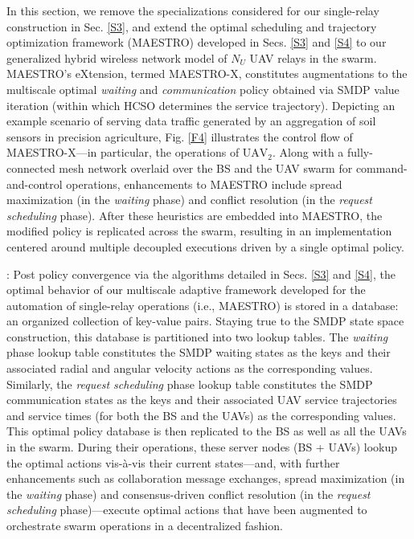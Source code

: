 \documentclass[12pt, draftcls, onecolumn]{IEEEtran}
\theoremstyle{plain}
\theoremstyle{definition}
\theoremstyle{remark}
\begin{document}
In this section, we remove the specializations considered for our single-relay construction in Sec. \ref{S3}, and extend the optimal scheduling and trajectory optimization framework (MAESTRO) developed in Secs. \ref{S3} and \ref{S4} to our generalized hybrid wireless network model of $N_{U}$ UAV relays in the swarm. MAESTRO's eXtension, termed MAESTRO-X, constitutes augmentations to the multiscale optimal \emph{waiting} and \emph{communication} policy obtained via SMDP value iteration (within which HCSO determines the service trajectory). Depicting an example scenario of serving data traffic generated by an aggregation of soil sensors in precision agriculture, Fig. \ref{F4} illustrates the control flow of MAESTRO-X---in particular, the operations of $\mathrm{UAV}_{2}$. Along with a fully-connected mesh network overlaid over the BS and the UAV swarm for command-and-control operations, enhancements to MAESTRO include spread maximization (in the \emph{waiting} phase) and conflict resolution (in the \emph{request scheduling} phase). After these heuristics are embedded into MAESTRO, the modified policy is replicated across the swarm, resulting in an implementation centered around multiple decoupled executions driven by a single optimal policy.

: Post policy convergence via the algorithms detailed in Secs. \ref{S3} and \ref{S4}, the optimal behavior of our multiscale adaptive framework developed for the automation of single-relay operations (i.e., MAESTRO) is stored in a database: an organized collection of key-value pairs. Staying true to the SMDP state space construction, this database is partitioned into two lookup tables. The \emph{waiting} phase lookup table constitutes the SMDP waiting states as the keys and their associated radial and angular velocity actions as the corresponding values. Similarly, the \emph{request scheduling} phase lookup table constitutes the SMDP communication states as the keys and their associated UAV service trajectories and service times (for both the BS and the UAVs) as the corresponding values. This optimal policy database is then replicated to the BS as well as all the UAVs in the swarm. During their operations, these server nodes (BS + UAVs) lookup the optimal actions vis-à-vis their current states---and, with further enhancements such as collaboration message exchanges, spread maximization (in the \emph{waiting} phase) and consensus-driven conflict resolution (in the \emph{request scheduling} phase)---execute optimal actions that have been augmented to orchestrate swarm operations in a decentralized fashion.
\end{document}
